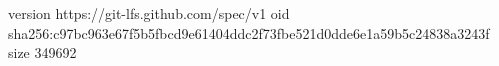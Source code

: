 version https://git-lfs.github.com/spec/v1
oid sha256:c97bc963e67f5b5fbcd9e61404ddc2f73fbe521d0dde6e1a59b5c24838a3243f
size 349692
